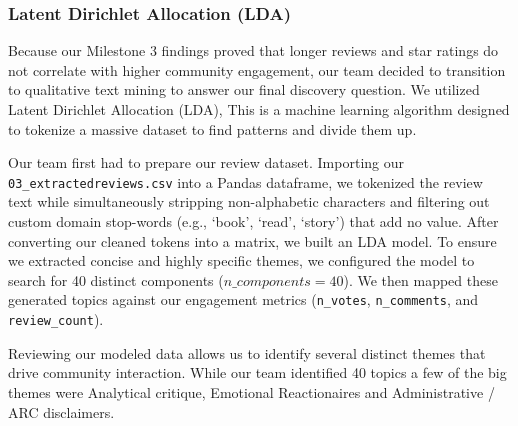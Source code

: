 \documentclass[conference]{IEEEtran}
\begin{document}
\subsubsection{Latent Dirichlet Allocation (LDA) }

Because our Milestone 3 findings proved that longer reviews and star ratings do not correlate with higher community engagement, our team decided to transition to qualitative text mining to answer our final discovery question. We utilized Latent Dirichlet Allocation (LDA), This is a machine learning algorithm designed to tokenize a massive dataset to find patterns and divide them up.

Our team first had to prepare our review dataset. Importing our \texttt{03\_extractedreviews.csv} into a Pandas dataframe, we tokenized the review text while simultaneously stripping non-alphabetic characters and filtering out custom domain stop-words (e.g., `book', `read', `story') that add no value. After converting our cleaned tokens into a matrix, we built an LDA model. To ensure we extracted concise and highly specific themes, we configured the model to search for 40 distinct components ($n\_components=40$). We then mapped these generated topics against our engagement metrics (\texttt{n\_votes}, \texttt{n\_comments}, and \texttt{review\_count}).

Reviewing our modeled data allows us to identify several distinct themes that drive community interaction. While our team identified 40 topics a few of the big themes were Analytical critique, Emotional Reactionaires and Administrative / ARC disclaimers.
\end{document}
